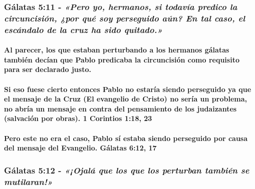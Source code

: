 \documentclass[11a pt,twoside]{article}
\newcommand{\scripture}[1]{%
  {\fontsize{12pt}{16pt}\selectfont\ScriptureFont\itshape #1}%
}
\let\oldsubsubsection\subsubsection
\renewcommand{\subsubsection}{\needspace{4\baselineskip}\oldsubsubsection}
\let\oldparagraph\paragraph
\renewcommand{\paragraph}{\needspace{3\baselineskip}\oldparagraph}
\begin{document}
\subsubsection{\texorpdfstring{Gálatas 5:11 -
\scripture{«Pero yo, hermanos, si todavía predico la circuncisión, ¿por qué soy perseguido aún? En tal caso, el escándalo de la cruz ha sido quitado.»}}{Gálatas 5:11 - }}\label{guxe1latas-511---pero-yo-hermanos-si-todavuxeda-predico-la-circuncisiuxf3n-por-quuxe9-soy-perseguido-auxfan-en-tal-caso-el-escuxe1ndalo-de-la-cruz-ha-sido-quitado.}

\paragraph{Al parecer, los que estaban perturbando a los hermanos
gálatas también decían que Pablo predicaba la circuncisión como
requisito para ser declarado
justo.}\label{al-parecer-los-que-estaban-perturbando-a-los-hermanos-guxe1latas-tambiuxe9n-decuxedan-que-pablo-predicaba-la-circuncisiuxf3n-como-requisito-para-ser-declarado-justo.}

\paragraph{Si eso fuese cierto entonces Pablo no estaría siendo
perseguido ya que el mensaje de la Cruz (El evangelio de Cristo) no
sería un problema, no abría un mensaje en contra del pensamiento de los
judaizantes (salvación por obras). 1 Corintios 1:18,
23}\label{si-eso-fuese-cierto-entonces-pablo-no-estaruxeda-siendo-perseguido-ya-que-el-mensaje-de-la-cruz-el-evangelio-de-cristo-no-seruxeda-un-problema-no-abruxeda-un-mensaje-en-contra-del-pensamiento-de-los-judaizantes-salvaciuxf3n-por-obras.-1-corintios-118-23}

\paragraph{Pero este no era el caso, Pablo sí estaba siendo perseguido
por causa del mensaje del Evangelio. Gálatas 6:12,
17}\label{pero-este-no-era-el-caso-pablo-suxed-estaba-siendo-perseguido-por-causa-del-mensaje-del-evangelio.-guxe1latas-612-17}

\subsubsection{\texorpdfstring{Gálatas 5:12 -
\scripture{«¡Ojalá que los que los perturban también se mutilaran!»}}{Gálatas 5:12 - }}\label{guxe1latas-512---ojaluxe1-que-los-que-los-perturban-tambiuxe9n-se-mutilaran}
\end{document}
